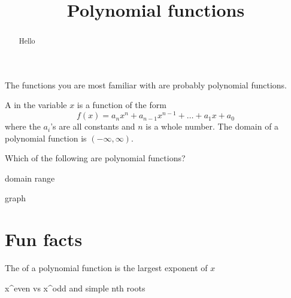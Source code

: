 \documentclass{ximera}
\title[Dig-In:]{Polynomial functions}
\begin{document}
\begin{abstract}
  Hello
\end{abstract}
\maketitle


The functions you are most familiar with are probably polynomial
functions.


\begin{definition}
  A  in the variable $x$ is a function
  of the form
  \[
  f(x) = a_nx^n + a_{n-1}x^{n-1} + \dots + a_1 x + a_0
  \]
  where the $a_i$'s are all constants and $n$ is a whole number. The
  domain of a polynomial function is $(-\infty,\infty)$.
\end{definition}

\begin{question}
  Which of the following are polynomial functions?
  \begin{multipleChoice}
  \end{multipleChoice}
\end{question}

domain range

graph



\section{Fun facts}


The  of a polynomial function is the largest exponent of $x$

x^even vs x^odd and simple nth roots
\end{document}
